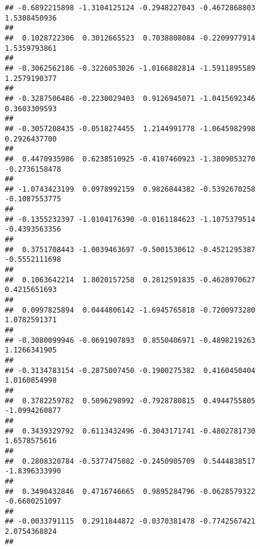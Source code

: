 \documentclass[]{article}
\begin{document}
\begin{verbatim}
## -0.6892215898 -1.3104125124 -0.2948227043 -0.4672868803  1.5308450936 
##                                                                       
##  0.1028722306  0.3012665523  0.7038808084 -0.2209977914  1.5359793861 
##                                                                       
## -0.3062562186 -0.3226053026 -1.0166882814 -1.5911895589  1.2579190377 
##                                                                       
## -0.3287506486 -0.2230029403  0.9126945071 -1.0415692346  0.3603309593 
##                                                                       
## -0.3057208435 -0.0518274455  1.2144991778 -1.0645982998  0.2926437700 
##                                                                       
##  0.4470935986  0.6238510925 -0.4107460923 -1.3809053270 -0.2736158478 
##                                                                       
## -1.0743423199  0.0978992159  0.9826844382 -0.5392670258 -0.1087553775 
##                                                                       
## -0.1355232397 -1.0104176390 -0.0161184623 -1.1075379514 -0.4393563356 
##                                                                       
##  0.3751708443 -1.0039463697 -0.5001530612 -0.4521295387 -0.5552111698 
##                                                                       
##  0.1063642214  1.8020157258  0.2812591835 -0.4628970627  0.4215651693 
##                                                                       
##  0.0997825894  0.0444806142 -1.6945765818 -0.7200973280  1.0782591371 
##                                                                       
## -0.3080099946 -0.0691907893  0.8550406971 -0.4898219263  1.1266341905 
##                                                                       
## -0.3134783154 -0.2875007450 -0.1900275382  0.4160450404  1.0160854998 
##                                                                       
##  0.3782259782  0.5096298992 -0.7928780815  0.4944755805 -1.0994260877 
##                                                                       
##  0.3439329792  0.6113432496 -0.3043171741 -0.4802781730  1.6578575616 
##                                                                       
##  0.2808320784 -0.5377475082 -0.2450905709  0.5444838517 -1.8396333990 
##                                                                       
##  0.3490432846  0.4716746665  0.9895284796 -0.0628579322 -0.6600251097 
##                                                                       
## -0.0033791115  0.2911844872 -0.0370381478 -0.7742567421  2.0754368824 
##                                                                       

\end{verbatim}
\end{document}
